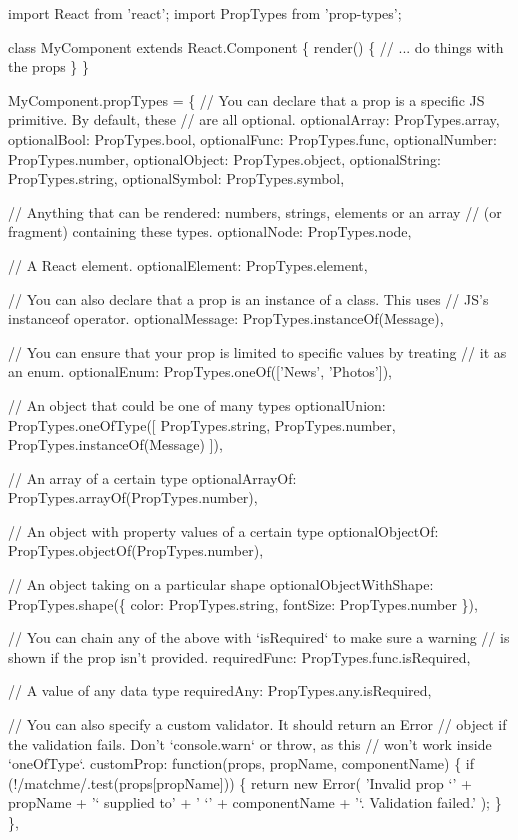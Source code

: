 \begin{DoxyCode}
import React from 'react';
import PropTypes from 'prop-types';

class MyComponent extends React.Component \{
  render() \{
    // ... do things with the props
  \}
\}

MyComponent.propTypes = \{
  // You can declare that a prop is a specific JS primitive. By default, these
  // are all optional.
  optionalArray: PropTypes.array,
  optionalBool: PropTypes.bool,
  optionalFunc: PropTypes.func,
  optionalNumber: PropTypes.number,
  optionalObject: PropTypes.object,
  optionalString: PropTypes.string,
  optionalSymbol: PropTypes.symbol,

  // Anything that can be rendered: numbers, strings, elements or an array
  // (or fragment) containing these types.
  optionalNode: PropTypes.node,

  // A React element.
  optionalElement: PropTypes.element,

  // You can also declare that a prop is an instance of a class. This uses
  // JS's instanceof operator.
  optionalMessage: PropTypes.instanceOf(Message),

  // You can ensure that your prop is limited to specific values by treating
  // it as an enum.
  optionalEnum: PropTypes.oneOf(['News', 'Photos']),

  // An object that could be one of many types
  optionalUnion: PropTypes.oneOfType([
    PropTypes.string,
    PropTypes.number,
    PropTypes.instanceOf(Message)
  ]),

  // An array of a certain type
  optionalArrayOf: PropTypes.arrayOf(PropTypes.number),

  // An object with property values of a certain type
  optionalObjectOf: PropTypes.objectOf(PropTypes.number),

  // An object taking on a particular shape
  optionalObjectWithShape: PropTypes.shape(\{
    color: PropTypes.string,
    fontSize: PropTypes.number
  \}),

  // You can chain any of the above with `isRequired` to make sure a warning
  // is shown if the prop isn't provided.
  requiredFunc: PropTypes.func.isRequired,

  // A value of any data type
  requiredAny: PropTypes.any.isRequired,

  // You can also specify a custom validator. It should return an Error
  // object if the validation fails. Don't `console.warn` or throw, as this
  // won't work inside `oneOfType`.
  customProp: function(props, propName, componentName) \{
    if (!/matchme/.test(props[propName])) \{
      return new Error(
        'Invalid prop `' + propName + '` supplied to' +
        ' `' + componentName + '`. Validation failed.'
      );
    \}
  \},


\end{DoxyCode}
